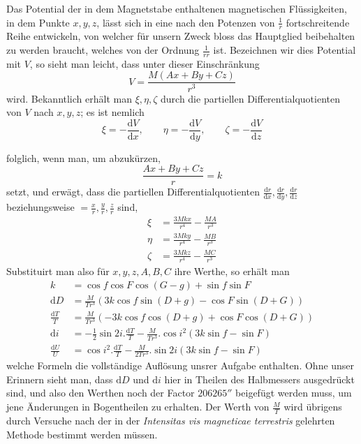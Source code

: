Das Potential der in dem Magnetstabe enthaltenen magnetischen Flüssigkeiten, in dem Punkte $x,y,z$, lässt sich in eine nach den Potenzen von $\frac1r$ fortschreitende Reihe entwickeln, von welcher für unsern Zweck bloss das Hauptglied beibehalten zu werden braucht, welches von der Ordnung $\frac{1}{rr}$ ist. Bezeichnen wir dies Potential mit $V$, so sieht man leicht, dass unter dieser Einschränkung
\[
V=\frac{M(Ax+By+Cz)}{r^3}
\]
wird. Bekanntlich erhält man $\xi,\eta,\zeta$ durch die partiellen Differentialquotienten von $V$ nach $x,y,z$; es ist nemlich
\[
\xi=-\frac{\mathrm{d}V}{\mathrm{d}x},\qquad\eta=-\frac{\mathrm{d}V}{\mathrm{d}y},\qquad\zeta=-\frac{\mathrm{d}V}{\mathrm{d}z}
\]
\par\clearpage
{}
\noindent folglich, wenn man, um abzukürzen,
\[
\frac{Ax+By+Cz}{r}=k
\]
setzt, und erwägt, dass die partiellen Differentialquotienten $\frac{\mathrm{d}r}{\mathrm{d}x},\frac{\mathrm{d}r}{\mathrm{d}y},\frac{\mathrm{d}r}{\mathrm{d}z}$ beziehungsweise $=\frac{x}{r},\frac{y}{r},\frac{z}{r}$ sind,
\[
\begin{aligned}
\xi&=\frac{3Mkx}{r^4}-\frac{MA}{r^3}\\
\eta&=\frac{3Mky}{r^4}-\frac{MB}{r^3}\\
\zeta&=\frac{3Mkz}{r^4}-\frac{MC}{r^3}
\end{aligned}
\]
Substituirt man also für $x,y,z,A,B,C$ ihre Werthe, so erhält man
\[
\begin{aligned}
k&=\cos f\cos F\cos(G-g)+\sin f\sin F\\
\mathrm{d}D&=\frac{M}{Tr^3}(3k\cos f\sin(D+g)-\cos F\sin(D+G))\\
\frac{\mathrm{d}T}{T}&=\frac{M}{Tr^3}(-3k\cos f\cos(D+g)+\cos F\cos(D+G))\\
\mathrm{d}i&=-\tfrac12\sin2i.\frac{\mathrm{d}T}{T}-\frac{M}{Tr^3}.\cos i^2(3k\sin f-\sin F)\\
\frac{\mathrm{d}U}{U}&=\cos i^2.\frac{\mathrm{d}T}{T}-\frac{M}{2Tr^3}.\sin2i(3k\sin f-\sin F)
\end{aligned}
\]
welche Formeln die vollständige Auflösung unsrer Aufgabe enthalten. Ohne unser Erinnern sieht man, dass $\mathrm{d}D$ und $\mathrm{d}i$ hier in Theilen des Halbmessers ausgedrückt sind, und also den Werthen noch der Factor $206265''$ beigefügt werden muss, um jene Änderungen in Bogentheilen zu erhalten. Der Werth von $\frac{M}{T}$ wird übrigens durch Versuche nach der in der \textit{Intensitas vis magneticae terrestris} gelehrten Methode bestimmt werden müssen.

